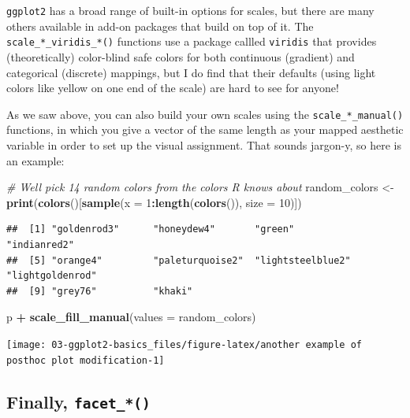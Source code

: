\documentclass[
]{book}
\newenvironment{Shaded}{\begin{snugshade}}{\end{snugshade}}
\newcommand{\AttributeTok}[1]{\textcolor[rgb]{0.13,0.29,0.53}{#1}}
\newcommand{\CommentTok}[1]{\textcolor[rgb]{0.56,0.35,0.01}{\textit{#1}}}
\newcommand{\DecValTok}[1]{\textcolor[rgb]{0.00,0.00,0.81}{#1}}
\newcommand{\FunctionTok}[1]{\textcolor[rgb]{0.13,0.29,0.53}{\textbf{#1}}}
\newcommand{\NormalTok}[1]{#1}
\newcommand{\OtherTok}[1]{\textcolor[rgb]{0.56,0.35,0.01}{#1}}
\newcommand{\SpecialCharTok}[1]{\textcolor[rgb]{0.81,0.36,0.00}{\textbf{#1}}}
\begin{document}
\texttt{ggplot2} has a broad range of built-in options for scales, but there are many others available in add-on packages that build on top of it. The \texttt{scale\_*\_viridis\_*()} functions use a package callled \texttt{viridis} that provides (theoretically) color-blind safe colors for both continuous (gradient) and categorical (discrete) mappings, but I do find that their defaults (using light colors like yellow on one end of the scale) are hard to see for anyone!

As we saw above, you can also build your own scales using the \texttt{scale\_*\_manual()} functions, in which you give a vector of the same length as your mapped aesthetic variable in order to set up the visual assignment. That sounds jargon-y, so here is an example:

\begin{Shaded}
\begin{Highlighting}[]
\CommentTok{\# We\textquotesingle{}ll pick 14 random colors from the colors R knows about}
\NormalTok{random\_colors }\OtherTok{\textless{}{-}} \FunctionTok{print}\NormalTok{(}\FunctionTok{colors}\NormalTok{()[}\FunctionTok{sample}\NormalTok{(}\AttributeTok{x =} \DecValTok{1}\SpecialCharTok{:}\FunctionTok{length}\NormalTok{(}\FunctionTok{colors}\NormalTok{()), }\AttributeTok{size =} \DecValTok{10}\NormalTok{)])}
\end{Highlighting}
\end{Shaded}

\begin{verbatim}
##  [1] "goldenrod3"      "honeydew4"       "green"           "indianred2"     
##  [5] "orange4"         "paleturquoise2"  "lightsteelblue2" "lightgoldenrod" 
##  [9] "grey76"          "khaki"
\end{verbatim}

\begin{Shaded}
\begin{Highlighting}[]
\NormalTok{p }\SpecialCharTok{+} 
  \FunctionTok{scale\_fill\_manual}\NormalTok{(}\AttributeTok{values =}\NormalTok{ random\_colors)}
\end{Highlighting}
\end{Shaded}

\begin{center}\texttt{[image: 03-ggplot2-basics\_files/figure-latex/another example of posthoc plot modification-1]} \end{center}

\hypertarget{finally-facet_}{%
\subsection{\texorpdfstring{Finally, \texttt{facet\_*()}}{Finally, facet\_*()}}\label{finally-facet_}}
\end{document}

